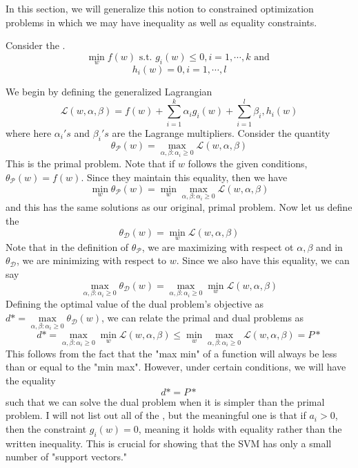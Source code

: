 \documentclass[12pt]{scrartcl}
\begin{document}
In this section, we will generalize this notion to constrained optimization problems in which we may have inequality as well as equality constraints. 
\begin{example}
    Consider the .
\[\min_w f(w) \text{ s.t. } g_i(w) \leq 0, i = 1, \cdots, k \text{ and }\]
\[h_i(w) = 0, i = 1, \cdots, l\]

We begin by defining the generalized Lagrangian
\[\mathcal{L}(w, \alpha, \beta) = f(w) + \sum_{i=1}^k \alpha_ig_i(w) + \sum_{i=1}^l \beta_i, h_i(w)\]
where here $\alpha_i's$ and $\beta_i's$ are the Lagrange multipliers. Consider the quantity 
\[\theta_{\mathcal{P}}(w) = \underset{\alpha, \beta: \alpha_i \geq 0}{\max}\mathcal{L}(w, \alpha, \beta)\]
This is the primal problem.
Note that if $w$ follows the given conditions, $\theta_{\mathcal{P}}(w) = f(w)$. Since they maintain this equality, then we have 
\[\underset{w}{\min}\theta_{\mathcal{P}}(w) = \underset{w}{\min}\underset{\alpha, \beta: \alpha_i \geq 0}{\max}\mathcal{L}(w, \alpha, \beta)\] and this has the same solutions as our original, primal problem. 
Now let us define the 
\[\theta_{\mathcal{D}}(w) = \underset{w}{\min}\mathcal{L}(w, \alpha, \beta)\]
Note that in the definition of $\theta_{\mathcal{P}}$, we are maximizing with respect ot $\alpha, \beta$ and in $\theta_{\mathcal{D}}$, we are minimizing with respect to $w$. Since we also have this equality, we can say
\[\underset{\alpha, \beta: \alpha_i \geq 0}{\max}\theta_{\mathcal{D}}(w) = \underset{\alpha, \beta: \alpha_i \geq 0 }{\max}\underset{w}{\min}\mathcal{L}(w, \alpha, \beta)\]
Defining the optimal value of the dual problem's objective as 
$d* = \underset{\alpha, \beta: \alpha_i \geq 0}{\max}\theta_{\mathcal{D}}(w)$, we can relate the primal and dual problems as 
\[d* = \underset{\alpha, \beta: \alpha_i \geq 0}{\max}\underset{w}{\min}\mathcal{L}(w, \alpha, \beta) \leq \underset{w}{\min}\underset{\alpha, \beta: \alpha_i \geq 0}{\max}\mathcal{L}(w, \alpha, \beta) = P*\]
This follows from the fact that the "max min" of a function will always be less than or equal to the "min max". However, under certain conditions, we will have the equality
\[d* = P*\]
such that we can solve the dual problem when it is simpler than the primal problem. I will not list out all of the , but the meaningful one is that if $a_i > 0$, then the constraint $g_i(w) = 0$, meaning it holds with equality rather than the written inequality. This is crucial for showing that the SVM has only a small number of "support vectors."
\end{example}
\end{document}

